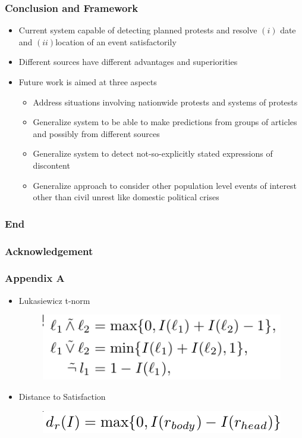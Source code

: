 \documentclass[red]{beamer}
\begin{document}
\begin{frame}
    \frametitle{Conclusion and Framework}
    \begin{itemize}
        \item
            Current system capable of detecting planned protests and resolve $(i)$ date and $(ii)$location of an event satisfactorily
        \item
            Different sources have different advantages and superiorities
        \item
            Future work is aimed at three aspects
            \begin{itemize}
                \item
                    Address situations involving nationwide protests and systems of protests
                \item
                    Generalize system to be able to make predictions from groups of articles and possibly from different sources
                \item
                    Generalize system to detect not-so-explicitly stated expressions of discontent
                \item
                    Generalize approach to consider other population level events of interest other than civil unrest like domestic political crises
                \end{itemize}
        \end{itemize}
\end{frame}

\begin{frame}
    \frametitle{End}
\end{frame}

\begin{frame}
    \frametitle{Acknowledgement}
\end{frame}


\begin{frame}[noframenumbering]
    \frametitle{Appendix A}
    \begin{itemize}
        \item  Lukasiewicz t-norm
    \begin{figure}
        \includegraphics[scale=0.4]{luke_norm}
    \end{figure}
    \item Distance to Satisfaction
    \begin{figure}
        \includegraphics[scale=0.4]{dis_sat_psl}
    \end{figure}
\end{itemize}
\end{frame}
\end{document}
